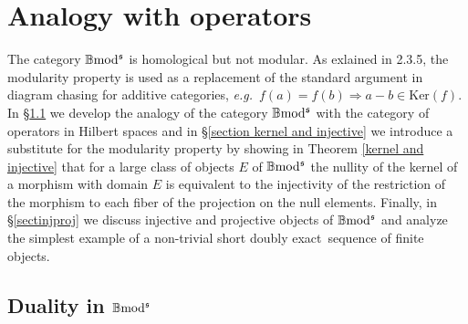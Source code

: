 \documentclass[12pt]{article}
\def\B{{\mathbb B}}
\def\exxx{{doubly exact}~}
\newcommand{\eg}{{\it e.g.\/}\ }
\def\ker{{\mbox{Ker}}}
\def\b2{{\rm \B mod^{\mathfrak s}}}
\begin{document}
     \section{Analogy with operators}\label{section analogy operators}
   The category $\b2$ is homological but not modular. As exlained in \cite{gra1} 2.3.5, the modularity property is used as a replacement of the standard argument in diagram chasing for additive categories, \eg $f(a)=f(b)\Rightarrow a-b\in \ker(f)$. In \S\ref{section duality b2} we develop the analogy of the category $\b2$ with the category of operators in Hilbert spaces  and in \S\ref{section kernel and injective} we introduce a substitute for the modularity property by showing in Theorem \ref{kernel and injective} that for a large class of objects $E$ of $\b2$ the nullity of the kernel of a morphism with domain $E$ is equivalent to the injectivity of the restriction of the morphism to each fiber of the projection on the null elements. Finally, in \S\ref{sectinjproj} we discuss injective and projective objects of $\b2$ and analyze the simplest example of a non-trivial short \exxx sequence of finite objects. 
    \subsection{Duality in $\b2$}\label{section duality b2}
  
\end{document}
